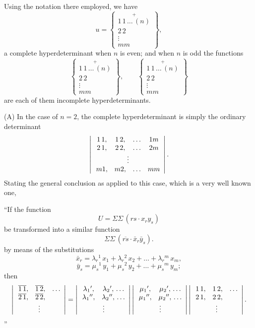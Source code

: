 \documentclass[11pt]{article}
\begin{document}
Using the notation there employed, we have
\[
u = \left\{
\begin{array}{c}
\overset{+}{1\,1\,\ldots\,(n)}\\
2\,2\\
\vdots\\
mm
\end{array}
\right\},
\]
a complete hyperdeterminant when $n$ is even; and when $n$ is odd the functions
\[
\left\{
\begin{array}{c}
\overset{+}{1\,1\,\ldots\,(n)}\\
2\,2\\
\vdots\\
mm
\end{array}
\right\},\qquad
\left\{
\begin{array}{c}
\overset{+}{1\,1\,\ldots\,(n)}\\
2\,2\\
\vdots\\
mm
\end{array}
\right\}
\]
are each of them incomplete hyperdeterminants.

(A) In the case of $n=2$, the complete hyperdeterminant is simply the ordinary
determinant
\[
\left|\,
\begin{array}{cccc}
1\,1, & 1\,2, & \ldots & 1m\\
2\,1, & 2\,2, & \ldots & 2m\\
\multicolumn{4}{c}{\vdots}\\
m1, & m2, & \ldots & mm
\end{array}
\right|.
\]
Stating the general conclusion as applied to this case, which is a very well known one,

``If the function
\[
U = \Sigma\Sigma\,(rs \cdot x_r y_s)
\]
be transformed into a similar function
\[
\Sigma\Sigma\,(\overline{rs}\cdot \bar{x}_r \bar{y}_s).
\]
by means of the substitutions
\[
\bar{x}_r = \lambda_r{}^1\,x_1 + \lambda_r{}^2\,x_2 + \ldots + \lambda_r{}^m\,x_m,
\]
\[
\bar{y}_s = \mu_s{}^1\,y_1 + \mu_s{}^2\,y_2 + \ldots + \mu_s{}^m\,y_m;
\]
then
\[
\left|\,
\begin{array}{cccc}
\overline{1\,1}, & \overline{1\,2}, & \ldots\\
\overline{2\,1}, & \overline{2\,2}, & \\
\multicolumn{3}{c}{\vdots}
\end{array}
\right| =
\left|\,
\begin{array}{cc}
\lambda_1{}', & \lambda_2{}',\,\ldots\\
\lambda_1{}'', & \lambda_2{}'',\,\ldots\\
\multicolumn{2}{c}{\vdots}
\end{array}
\right|
\left|\,
\begin{array}{cc}
\mu_1{}', & \mu_2{}',\,\ldots\\
\mu_1{}'', & \mu_2{}'',\,\ldots\\
\multicolumn{2}{c}{\vdots}
\end{array}
\right|
\left|\,
\begin{array}{ccc}
1\,1, & 1\,2, & \ldots\\
2\,1, & 2\,2, & \\
\multicolumn{3}{c}{\vdots}
\end{array}
\right|.
\]''
\end{document}
